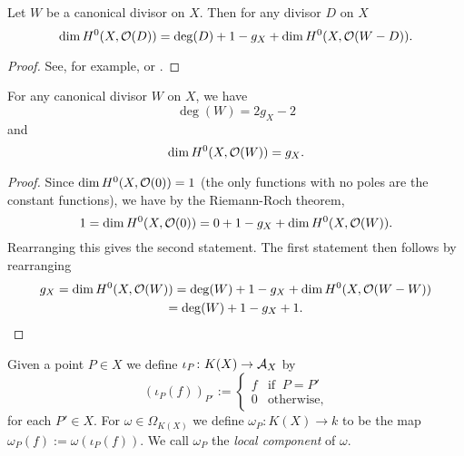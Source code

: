     \begin{thm}\label{theoremriemannroch}
    Let $W$ be a canonical divisor on $X$.
    Then for any divisor $D$ on $X$ 
        \[
        \dim H^0(X,{\cal O}(D)) = \deg(D) + 1 - g_X + \dim H^0(X,{\cal O}(W-D)).
        \]
    \end{thm}
    \begin{proof}
    See, for example, \cite[8.6]{fulton} or \cite[Thm. 1.5.15]{stichtenoth}.
    \end{proof}


    \begin{cor}\label{dim=gc}
    For any canonical divisor $W$ on $X$, we have 
        \[
        \deg(W) = 2g_X-2
        \]
    and 
        \[
        \dim H^0(X,{\cal O}(W)) = g_X.
        \]
    \end{cor}
    \begin{proof}
    Since $\dim H^0(X,{\cal O}(0)) = 1$ (the only functions with no poles are the constant functions), we have by the Riemann-Roch theorem, 
        \[
        1= \dim H^0(X,{\cal O}(0)) = 0 + 1 -g_X + \dim H^0(X,{\cal O}(W)).
        \]
    Rearranging this gives the second statement.
    The first statement then follows by rearranging
        \begin{multline*}
        g_X = \dim H^0(X,{\cal O}(W)) = \deg(W) + 1 -g_X +  \dim H^0(X,{\cal O}(W-W))\\ = \deg(W) + 1 -g_X + 1.
        \end{multline*}
    \end{proof}


Given a point $P\in X$ we define $\iota_P\colon K(X) \rightarrow {\mathcal A}_X$ by
    \begin{equation}
    (\iota_P(f))_{P'}:= 
        \begin{cases}
        f & \text{if }\ P=P'\\
        0 & \text{otherwise},
        \end{cases}
    \end{equation}
for each $P'\in X$.
For $\omega \in \Omega_{K(X)}$ we define $\omega_P\colon K(X) \rightarrow k$ to be the map $\omega_P(f) := \omega(\iota_P(f))$.
We call $\omega_P$ the {\em local component} of $\omega$.

